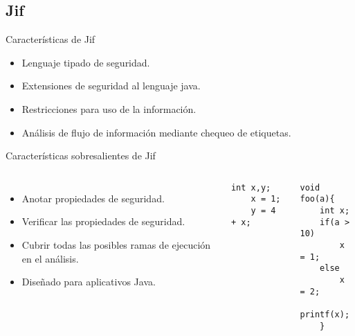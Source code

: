 \subsection{Jif}
\begin{frame}{Características de Jif}
\begin{itemize}
  \item Lenguaje tipado de seguridad.
  \item Extensiones de seguridad al lenguaje java.
  \item Restricciones para uso de la información.
  \item Análisis de flujo de información mediante chequeo de etiquetas.
\end{itemize}
\end{frame}
\begin{frame}[fragile]{Características sobresalientes de Jif}
\begin{columns}[T]
\column{2in}
	\begin{itemize}
	  \item Anotar propiedades de seguridad.
	  \item Verificar las propiedades de seguridad.
	  \item Cubrir todas las posibles ramas de ejecución en el análisis.
	  \item Diseñado para aplicativos Java.
	\end{itemize}
\begin{lstlisting}[style=base]
	int x,y;
	x = 1;	
	y = 4 + x;
\end{lstlisting}
\begin{lstlisting}[style=base]
	void foo(a){
	int x;
	if(a > 10)
		x = 1;
	else
		x = 2;
	printf(x);
	}
\end{lstlisting}
\end{columns}

\end{frame}

